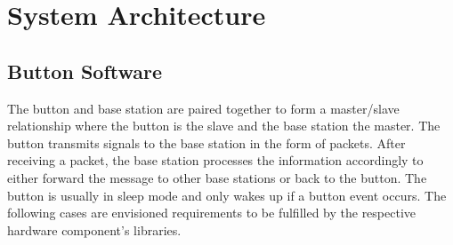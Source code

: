 \documentclass[journal,compsoc]{IEEEtran}
\begin{document}
\section{System Architecture}

\subsection{Button Software}

The button and base station are paired together to form a master/slave relationship where the button is the slave and the base station the master.  The button transmits signals to the base station in the form of packets.  After receiving a packet, the base station processes the information accordingly to either forward the message to other base stations or back to the button.  The button is usually in sleep mode and only wakes up if a button event occurs.  The following cases are envisioned requirements to be fulfilled by the respective hardware component’s libraries.
\end{document}
